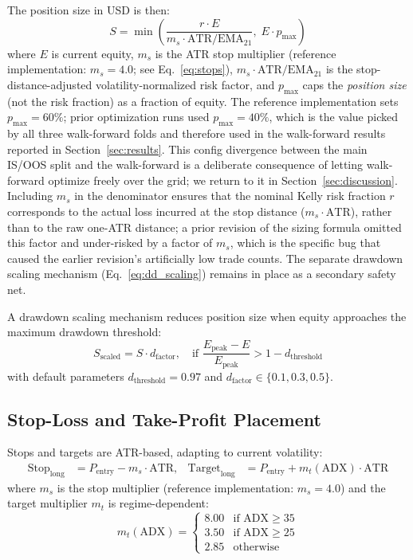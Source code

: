 \documentclass{article}
\begin{document}
The position size in USD is then:
\begin{equation}
  S = \min\!\left(\frac{r \cdot E}{m_s \cdot \text{ATR} / \text{EMA}_{21}},\; E \cdot p_{\max}\right)
  \label{eq:sizing}
\end{equation}
where $E$ is current equity, $m_s$ is the ATR stop multiplier (reference implementation: $m_s = 4.0$; see Eq.~\eqref{eq:stops}), $m_s \cdot \text{ATR}/\text{EMA}_{21}$ is the stop-distance-adjusted volatility-normalized risk factor, and $p_{\max}$ caps the \emph{position size} (not the risk fraction) as a fraction of equity.
The reference implementation sets $p_{\max} = 60\%$; prior optimization runs used $p_{\max} = 40\%$, which is the value picked by all three walk-forward folds and therefore used in the walk-forward results reported in Section~\ref{sec:results}.
This config divergence between the main IS/OOS split and the walk-forward is a deliberate consequence of letting walk-forward optimize freely over the grid; we return to it in Section~\ref{sec:discussion}.
Including $m_s$ in the denominator ensures that the nominal Kelly risk fraction $r$ corresponds to the actual loss incurred at the stop distance ($m_s \cdot \text{ATR}$), rather than to the raw one-ATR distance; a prior revision of the sizing formula omitted this factor and under-risked by a factor of $m_s$, which is the specific bug that caused the earlier revision's artificially low trade counts.
The separate drawdown scaling mechanism (Eq.~\eqref{eq:dd_scaling}) remains in place as a secondary safety net.

A drawdown scaling mechanism reduces position size when equity approaches the maximum drawdown threshold:
\begin{equation}
  S_{\text{scaled}} = S \cdot d_{\text{factor}}, \quad \text{if } \frac{E_{\text{peak}} - E}{E_{\text{peak}}} > 1 - d_{\text{threshold}}
  \label{eq:dd_scaling}
\end{equation}
with default parameters $d_{\text{threshold}} = 0.97$ and $d_{\text{factor}} \in \{0.1, 0.3, 0.5\}$.

\subsection{Stop-Loss and Take-Profit Placement}

Stops and targets are ATR-based, adapting to current volatility:
\begin{align}
  \text{Stop}_{\text{long}} &= P_{\text{entry}} - m_s \cdot \text{ATR}, &
  \text{Target}_{\text{long}} &= P_{\text{entry}} + m_t(\text{ADX}) \cdot \text{ATR}
  \label{eq:stops}
\end{align}
where $m_s$ is the stop multiplier (reference implementation: $m_s = 4.0$) and the target multiplier $m_t$ is regime-dependent:
\begin{equation}
  m_t(\text{ADX}) =
  \begin{cases}
    8.00 & \text{if ADX} \geq 35 \\
    3.50 & \text{if ADX} \geq 25 \\
    2.85 & \text{otherwise}
  \end{cases}
  \label{eq:target_mult}
\end{equation}
\end{document}
